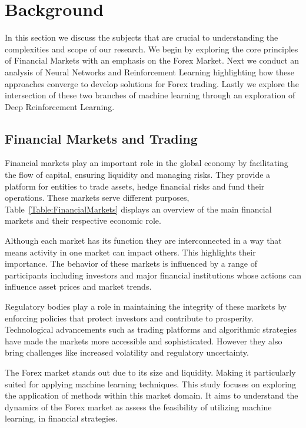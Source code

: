 \section{Background}

In this section we discuss the subjects that are crucial to understanding the complexities and scope of our research. We begin by exploring the core principles of Financial Markets with an emphasis on the Forex Market. Next we conduct an analysis of Neural Networks and Reinforcement Learning highlighting how these approaches converge to develop solutions for Forex trading. Lastly we explore the intersection of these two branches of machine learning through an exploration of Deep Reinforcement Learning.

\subsection{Financial Markets and Trading}

Financial markets play an important role in the global economy by facilitating the flow of capital, ensuring liquidity and managing risks. They provide a platform for entities to trade assets, hedge financial risks and fund their operations. These markets serve different purposes, Table~\ref{Table:FinancialMarkets} displays an overview of the main financial markets and their respective economic role.



Although each market has its function they are interconnected in a way that means activity in one market can impact others. This highlights their importance. The behavior of these markets is influenced by a range of participants including investors and major financial institutions whose actions can influence asset prices and market trends.

Regulatory bodies play a role in maintaining the integrity of these markets by enforcing policies that protect investors and contribute to prosperity. Technological advancements such as trading platforms and algorithmic strategies have made the markets more accessible and sophisticated. However they also bring challenges like increased volatility and regulatory uncertainty.

The Forex market stands out due to its size and liquidity. Making it particularly suited for applying machine learning techniques. This study focuses on exploring the application of methods within this market domain. It aims to understand the dynamics of the Forex market as assess the feasibility of utilizing machine learning, in financial strategies.


